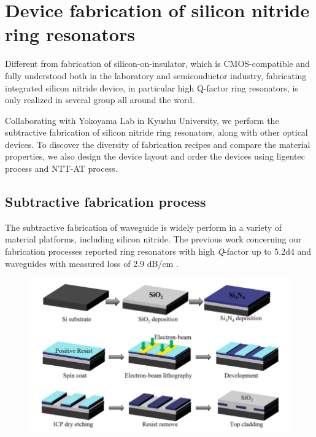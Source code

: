 
\chapter{Device fabrication of silicon nitride ring resonators}

Different from fabrication of silicon-on-insulator, which is CMOS-compatible and fully understood both in the laboratory and semiconductor industry, fabricating integrated silicon nitride device, in particular high Q-factor ring resonators, is only realized in several group all around the word. 

Collaborating with Yokoyama Lab in Kyushu University, we perform the subtractive fabrication of silicon nitride ring resonators, along with other optical devices. To discover the diversity of fabrication recipes and compare the material properties, we also design the device layout and order the devices using ligentec process and NTT-AT process.

\section{Subtractive fabrication process}

The subtractive fabrication of waveguide is widely perform in a variety of material platforms, including silicon nitride. The previous work concerning our fabrication processes reported ring resonators with high \textit{Q}-factor up to \num{5.2d4} and waveguides with measured loss of 2.9 dB/cm \cite{Cheng2017b}. 

\begin{figure}
	\centering
	\includegraphics[width=1.0\linewidth]{imgs/png/fab-flow}
	\label{fig:fab-flow}
\end{figure}

